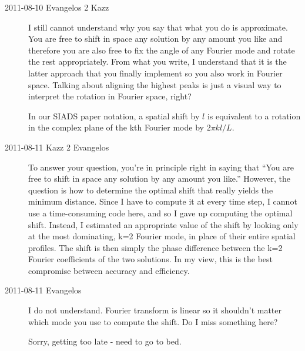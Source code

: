 \begin{description}
\item[2011-08-10 Evangelos 2 Kazz] I still cannot understand why you say that
what you do is approximate.
You are free to shift in space any solution by any amount you like and
therefore you are also free to fix the angle of any Fourier mode and
rotate the rest appropriately. From what you write, I understand that
it is the latter approach that you finally implement so you also work
in Fourier space. Talking about aligning the highest peaks is just a
visual way to interpret the rotation in Fourier space, right?

In our SIADS paper notation, a spatial shift by $l$ is equivalent to a
rotation in the complex plane of the kth Fourier mode by $2\pi k l /L$.

\item[2011-08-11 Kazz 2 Evangelos] To answer your question, you're in principle
right in saying that
``You are free to shift in space any solution by any amount you like.''
However, the question is how to determine the optimal shift that really yields
the minimum distance. Since I have to compute it at every time step,
I cannot use a time-consuming code here, and so I gave up computing the
optimal shift. Instead, I estimated an appropriate value of the shift by
looking only at the most dominating, k=2 Fourier mode, in place of their
entire spatial profiles. The shift is then simply the phase difference
between the k=2 Fourier coefficients of the two solutions.
In my view, this is the best compromise between accuracy and efficiency.

\item[2011-08-11 Evangelos] I do not understand. Fourier transform is
linear so it shouldn't matter which mode you use to compute the shift.
Do I miss something here?



Sorry, getting too late - need to go to bed.
\end{description}
